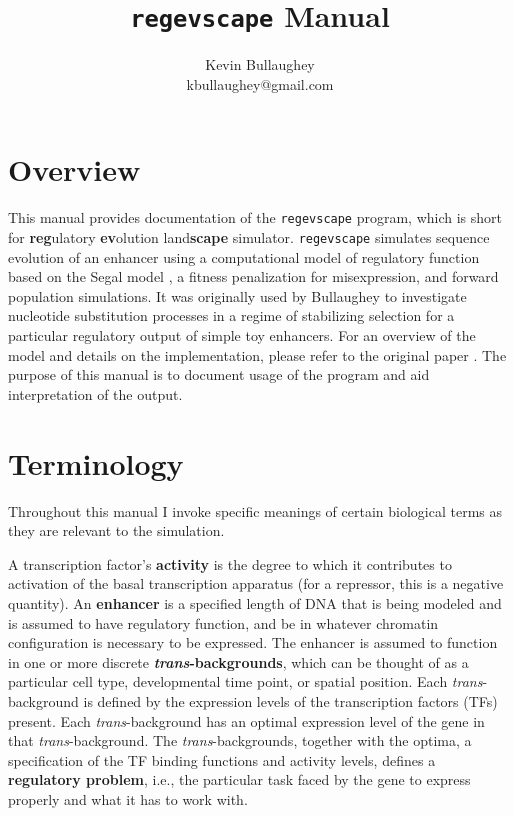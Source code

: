 \documentclass[11pt]{article}
\author{Kevin Bullaughey \\ \normalsize{kbullaughey@gmail.com}}
\title{\texttt{regevscape} Manual}
\begin{document}
\maketitle

\section*{Overview}

This manual provides documentation of the \texttt{regevscape} program, which is short for \textbf{reg}ulatory \textbf{ev}olution land\textbf{scape} simulator. \texttt{regevscape} simulates sequence evolution of an enhancer using a computational model of regulatory function based on the Segal model \cite{Segal:2008fk}, a fitness penalization for misexpression, and forward population simulations. It was originally used by Bullaughey \cite{KLBullaughey11232010} to investigate nucleotide substitution processes in a regime of stabilizing selection for a particular regulatory output of simple toy enhancers. For an overview of the model and details on the implementation, please refer to the original paper \cite{KLBullaughey11232010}. The purpose of this manual is to document usage of the program and aid interpretation of the output.

\section*{Terminology}

Throughout this manual I invoke specific meanings of certain biological terms as they are relevant to the simulation. 

A transcription factor's \textbf{activity} is the degree to which it contributes to activation of the basal transcription apparatus (for a repressor, this is a negative quantity). An \textbf{enhancer} is a specified length of DNA that is being modeled and is assumed to have regulatory function, and be in whatever chromatin configuration is necessary to be expressed. The enhancer is assumed to function in one or more discrete \textbf{\emph{trans}-backgrounds}, which can be thought of as a particular cell type, developmental time point, or spatial position. Each \emph{trans}-background is defined by the expression levels of the transcription factors (TFs) present. Each \emph{trans}-background has an optimal expression level of the gene in that \emph{trans}-background. The \emph{trans}-backgrounds, together with the optima, a specification of the TF binding functions and activity levels, defines a \textbf{regulatory problem}, i.e., the particular task faced by the gene to express properly and what it has to work with.
\end{document}
